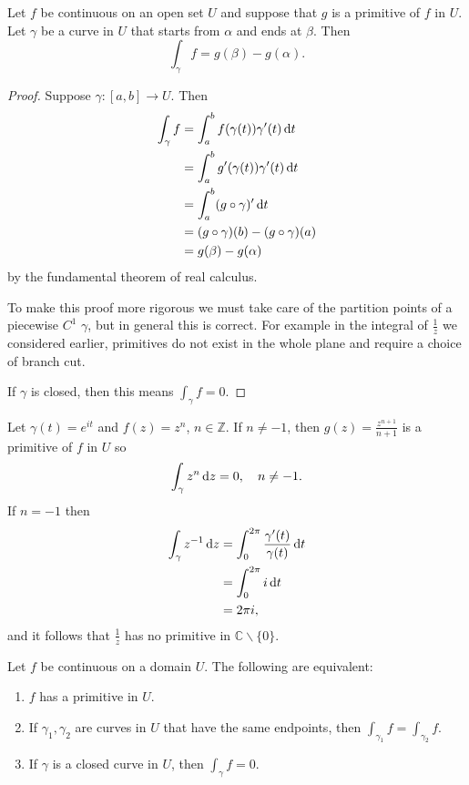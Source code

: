 \begin{theorem}
  Let $f$ be continuous on an open set $U$ and suppose that
  $g$ is a primitive of $f$ in $U$. Let $\gamma$ be a curve
  in $U$ that starts from $\alpha$ and ends at $\beta$.
  Then
  $$
  \int_\gamma f = g(\beta) - g(\alpha).
  $$
\end{theorem}

\begin{proof}
Suppose $\gamma : [a, b] \to U$. Then
\begin{align*}
   \int_\gamma f
&= \int_a^b f(\gamma(t)) \gamma^\prime(t) \mathop{}\!\mathrm{d} t \\
&= \int_a^b g^\prime(\gamma(t)) \gamma^\prime(t) \mathop{}\!\mathrm{d} t \\
&= \int_a^b (g \circ \gamma)^\prime \mathop{}\!\mathrm{d} t \\
&= (g \circ \gamma)(b) - (g \circ \gamma)(a) \\
&= g(\beta) - g(\alpha)
\end{align*}
by the fundamental theorem of real calculus.

To make this proof more rigorous we must take care of the
partition points of a piecewise $C^1$ $\gamma$, but in general
this is correct. For example in the integral of $\frac{1}{z}$ we
considered earlier, primitives do not exist in the whole plane
and require a choice of branch cut.

If $\gamma$ is closed, then this means $\int_\gamma f = 0$.
\end{proof}

\begin{xmpl}
Let $\gamma(t) = e^{it}$ and $f(z) = z^n$, $n \in \mathbb{Z}$.
If $n \neq -1$, then $g(z) = \frac{z^{n+1}}{n+1}$ is a primitive
of $f$ in $U$ so
$$
\int_\gamma z^n \mathop{}\!\mathrm{d} z = 0, \quad n \neq -1.
$$
If $n = -1$ then
\begin{align*}
   \int_\gamma z^{-1} \mathop{}\!\mathrm{d} z
&= \int_0^{2\pi}
     \frac{\gamma^\prime(t)}{\gamma(t)} \mathop{}\!\mathrm{d} t \\
&= \int_0^{2\pi} i \mathop{}\!\mathrm{d} t \\
&= 2 \pi i,
\end{align*}
and it follows that $\frac{1}{z}$ has no primitive in
$\mathbb{C} \backslash \{ 0 \}$.
\end{xmpl}

\begin{theorem}
  Let $f$ be continuous on a domain $U$. The following are equivalent:
  \begin{enumerate}
    \item{
      $f$ has a primitive in $U$.
    }
    \item{
      If $\gamma_1, \gamma_2$ are curves in $U$ that have the
      same endpoints, then $\int_{\gamma_1} f = \int_{\gamma_2} f$.
    }
    \item{
      If $\gamma$ is a closed curve in $U$, then
      $\int_\gamma f = 0$.
    }
  \end{enumerate}
\end{theorem}

